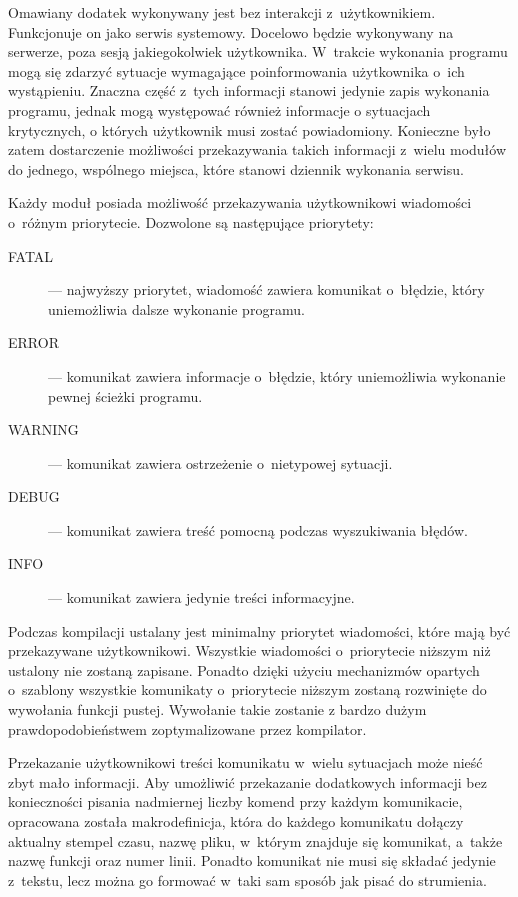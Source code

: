 Omawiany dodatek wykonywany jest bez interakcji
z~użytkownikiem. Funkcjonuje on jako serwis systemowy. Docelowo będzie
wykonywany na serwerze, poza sesją jakiegokolwiek
użytkownika. W~trakcie wykonania programu mogą się zdarzyć sytuacje
wymagające poinformowania użytkownika o~ich wystąpieniu. Znaczna część
z~tych informacji stanowi jedynie zapis wykonania programu, jednak
mogą występować również informacje o sytuacjach krytycznych, o których
użytkownik musi zostać powiadomiony. Konieczne było zatem dostarczenie
możliwości przekazywania takich informacji z~wielu modułów do jednego,
wspólnego miejsca, które stanowi dziennik wykonania serwisu.

Każdy moduł posiada możliwość przekazywania użytkownikowi wiadomości
o~różnym priorytecie. Dozwolone są następujące priorytety:

\begin{description}
\item[FATAL] --- najwyższy priorytet, wiadomość zawiera komunikat
  o~błędzie, który uniemożliwia dalsze wykonanie programu.
\item[ERROR] --- komunikat zawiera informacje o~błędzie, który
  uniemożliwia wykonanie pewnej ścieżki programu.
\item[WARNING] --- komunikat zawiera ostrzeżenie o~nietypowej sytuacji.
\item[DEBUG] --- komunikat zawiera treść pomocną podczas wyszukiwania błędów.
\item[INFO] --- komunikat zawiera jedynie treści informacyjne.
\end{description}

Podczas kompilacji ustalany jest minimalny priorytet wiadomości, które
mają być przekazywane użytkownikowi. Wszystkie wiadomości
o~priorytecie niższym niż ustalony nie zostaną zapisane. Ponadto
dzięki użyciu mechanizmów opartych o~szablony wszystkie komunikaty
o~priorytecie niższym zostaną rozwinięte do wywołania funkcji
pustej. Wywołanie takie zostanie z bardzo dużym prawdopodobieństwem
zoptymalizowane przez kompilator.

Przekazanie użytkownikowi treści komunikatu w~wielu sytuacjach może
nieść zbyt mało informacji. Aby umożliwić przekazanie dodatkowych
informacji bez konieczności pisania nadmiernej liczby komend przy
każdym komunikacie, opracowana została makrodefinicja, która do
każdego komunikatu dołączy aktualny stempel czasu, nazwę pliku,
w~którym znajduje się komunikat, a~także nazwę funkcji oraz numer
linii. Ponadto komunikat nie musi się składać jedynie z~tekstu, lecz
można go formować w~taki sam sposób jak pisać do strumienia.

